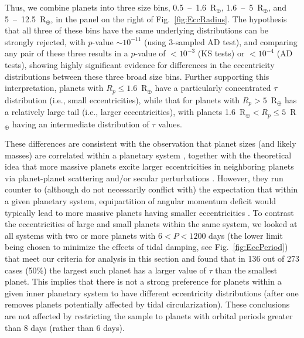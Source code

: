 \documentclass{aastex62}
\newcommand{\blue}[1]{\textcolor{blue}{#1}}
\begin{document}
Thus, we combine planets into three size bins,  0.5~--~1.6~R$_\oplus$, 1.6~--~5~R$_\oplus$, and 5~--~12.5~R$_\oplus$, in the panel on the right of Fig.~\ref{fig:EccRadius}. The hypothesis that all three of these bins have the same underlying distributions can be strongly rejected, with $p$-value $\sim10^{-11}$ (using 3-sampled AD test), and
comparing any pair of these three results in a $p$-value of $<10^{-3}$ (KS tests) or $<10^{-4}$ (AD tests), showing highly significant evidence for differences in the eccentricity distributions between these three broad size bins. 
Further supporting this interpretation, planets with $R_p\le 1.6$~R$_\oplus$ have a particularly concentrated $\tau$ distribution (i.e., small eccentricities), while that for planets with $R_p > 5$~R$_\oplus$ has a relatively large tail (i.e., larger eccentricities), with planets 1.6~R$_\oplus < R_p \le 5$~R$_\oplus$ having an intermediate distribution of  $\tau$ values.

These differences are consistent with the observation that planet sizes (and likely masses) are correlated within a planetary system \citep{Ciardi:2013,Weiss:2018,Millholland:2017,He:2020}, together with the theoretical idea that more massive planets excite larger eccentricities in neighboring planets via planet-planet scattering and/or secular perturbations \citep{FordRasio:2008,Johansen:2012,Pu:2015,Laskar:2000}.  However, they run counter to (although do not necessarily conflict with) the expectation that within a given planetary system, equipartition of angular momentum deficit would typically lead to more massive planets having smaller eccentricities \citep{Lissauer:1995}. To contrast the eccentricities of large and small planets within the same system, we looked at all systems with two or more planets with $6 < P < 1200$ days (the lower limit being chosen to minimize the effects of tidal damping, see Fig.~\ref{fig:EccPeriod}) that meet our criteria for analysis in this section and found that in 136 out of 273 cases (50\%) the largest such planet has a larger value of $\tau$ than the smallest planet.  This implies that there is not a strong preference for planets  within a given inner planetary system to have different eccentricity distributions (after one removes planets potentially affected by tidal circularization).
%
These conclusions are not affected by restricting the sample to planets with orbital periods greater than 8 days (rather than 6 days).

\end{document}
